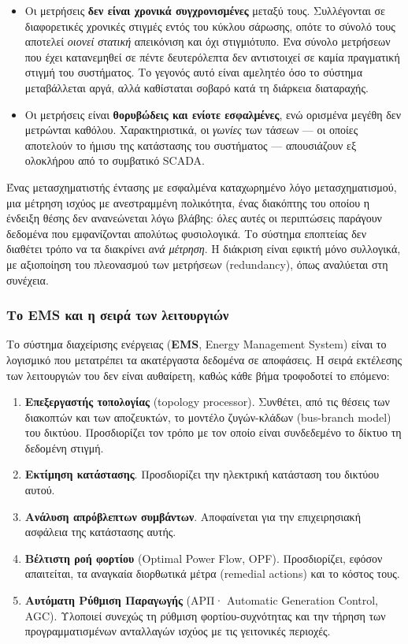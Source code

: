 \begin{itemize}
\item Οι μετρήσεις \textbf{δεν είναι χρονικά συγχρονισμένες} μεταξύ τους. Συλλέγονται σε
      διαφορετικές χρονικές στιγμές εντός του κύκλου σάρωσης, οπότε το σύνολό τους αποτελεί
      \emph{οιονεί στατική} απεικόνιση και όχι στιγμιότυπο. Ένα σύνολο μετρήσεων που έχει
      κατανεμηθεί σε πέντε δευτερόλεπτα δεν αντιστοιχεί σε καμία πραγματική στιγμή του
      συστήματος. Το γεγονός αυτό είναι αμελητέο όσο το σύστημα μεταβάλλεται αργά, αλλά
      καθίσταται σοβαρό κατά τη διάρκεια διαταραχής.
\item Οι μετρήσεις είναι \textbf{θορυβώδεις και ενίοτε εσφαλμένες}, ενώ ορισμένα μεγέθη δεν
      μετρώνται καθόλου. Χαρακτηριστικά, οι \emph{γωνίες} των τάσεων — οι οποίες αποτελούν
      το ήμισυ της κατάστασης του συστήματος — απουσιάζουν εξ ολοκλήρου από το συμβατικό
      SCADA.
\end{itemize}

Ένας μετασχηματιστής έντασης με εσφαλμένα καταχωρημένο λόγο μετασχηματισμού, μια μέτρηση
ισχύος με ανεστραμμένη πολικότητα, ένας διακόπτης του οποίου η ένδειξη θέσης δεν
ανανεώνεται λόγω βλάβης: όλες αυτές οι περιπτώσεις
παράγουν δεδομένα που εμφανίζονται απολύτως φυσιολογικά. Το σύστημα εποπτείας δεν διαθέτει
τρόπο να τα διακρίνει \emph{ανά μέτρηση}. Η διάκριση είναι εφικτή μόνο συλλογικά, με
αξιοποίηση του πλεονασμού των μετρήσεων (redundancy), όπως αναλύεται στη συνέχεια.

\subsubsection*{Το EMS και η σειρά των λειτουργιών}

Το σύστημα διαχείρισης ενέργειας (\textbf{EMS}, Energy Management System) είναι το λογισμικό που μετατρέπει τα ακατέργαστα
δεδομένα σε αποφάσεις. Η σειρά εκτέλεσης των λειτουργιών του δεν είναι αυθαίρετη, καθώς
κάθε βήμα τροφοδοτεί το επόμενο:

\begin{enumerate}
\item \textbf{Επεξεργαστής τοπολογίας} (topology processor). Συνθέτει, από τις θέσεις των
      διακοπτών και των αποζευκτών, το μοντέλο ζυγών-κλάδων (bus-branch model) του δικτύου. Προσδιορίζει τον
      τρόπο με τον οποίο είναι συνδεδεμένο το δίκτυο τη δεδομένη στιγμή.
\item \textbf{Εκτίμηση κατάστασης}. Προσδιορίζει την ηλεκτρική κατάσταση του δικτύου αυτού.
\item \textbf{Ανάλυση απρόβλεπτων συμβάντων}. Αποφαίνεται για την επιχειρησιακή ασφάλεια
      της κατάστασης αυτής.
\item \textbf{Βέλτιστη ροή φορτίου} (Optimal Power Flow, OPF). Προσδιορίζει, εφόσον
      απαιτείται, τα αναγκαία διορθωτικά μέτρα (remedial actions) και το κόστος τους.
\item \textbf{Αυτόματη Ρύθμιση Παραγωγής} (ΑΡΠ· Automatic Generation Control, AGC).
      Υλοποιεί συνεχώς τη ρύθμιση φορτίου-συχνότητας και την τήρηση των προγραμματισμένων
      ανταλλαγών ισχύος με τις γειτονικές περιοχές.
\end{enumerate}

